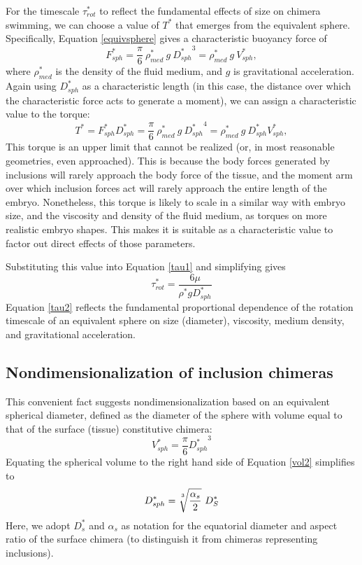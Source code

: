 \documentclass[10pt,a4paper]{article}
\begin{document}
For the timescale $\tau_{rot}^*$ to reflect the fundamental effects of size on chimera swimming, we can choose a value of $T^*$ that emerges from the equivalent sphere.
Specifically, Equation \ref{equivsphere} gives a characteristic buoyancy force of
\begin{equation}\label{charF}
	F_{sph}^* = \frac{\pi}{6} ~ \rho_{med}^* ~ g ~ {D_{sph}^*}^3 = \rho_{med}^* ~ g ~ V_{sph}^*,
\end{equation} 
where $\rho_{med}^*$ is the density of the fluid medium, and $g$ is gravitational acceleration.
Again using $D_{sph}^*$ as a characteristic length (in this case, the distance over which the characteristic force acts to generate a moment), we can assign a characteristic value to the torque:
\begin{equation}\label{charT}
	T^* = F_{sph}^* D_{sph}^* = \frac{\pi}{6} ~ \rho_{med}^* ~ g ~ {D_{sph}^*}^4 = \rho_{med}^* ~ g ~ D_{sph}^* V_{sph}^*,
\end{equation} 
This torque is an upper limit that cannot be realized (or, in most reasonable geometries, even approached).
This is because the body forces generated by inclusions will rarely approach the body force of the tissue, and the moment arm over which inclusion forces act will rarely approach the entire length of the embryo. 
Nonetheless, this torque is likely to scale in a similar way with embryo size, and the viscosity and density of the fluid medium, as torques on more realistic embryo shapes. This makes it is suitable as a characteristic value to factor out direct effects of those parameters.

Substituting this value into Equation \ref{tau1} and simplifying gives
\begin{equation}\label{tau2}
	\tau_{rot}^* = \frac{6 \mu}{\rho^* g D_{sph}^*}
\end{equation}
Equation \ref{tau2} reflects the fundamental proportional dependence of the rotation timescale of an equivalent sphere on size (diameter), viscosity, medium density, and gravitational acceleration.

\subsection{Nondimensionalization of inclusion chimeras}
This convenient fact suggests nondimensionalization based on an equivalent spherical diameter, defined as the diameter of the sphere with volume equal to that of the surface (tissue) constitutive chimera:
\begin{equation}\label{equivsphere}
	V_{sph}^* = \frac{\pi}{6} {D_{sph}^*}^3
\end{equation} 
Equating the spherical volume to the right hand side of Equation \ref{vol2} simplifies to
\begin{equation}\label{equivD}
	D_{sph}^* = \sqrt[\uproot{5}3]{\frac{\alpha_s}{2}} ~ D_S^*
\end{equation} 
Here, we adopt $D_s^*$ and $\alpha_s$ as notation for the equatorial diameter and aspect ratio of the surface chimera (to distinguish it from chimeras representing inclusions).
\end{document}
